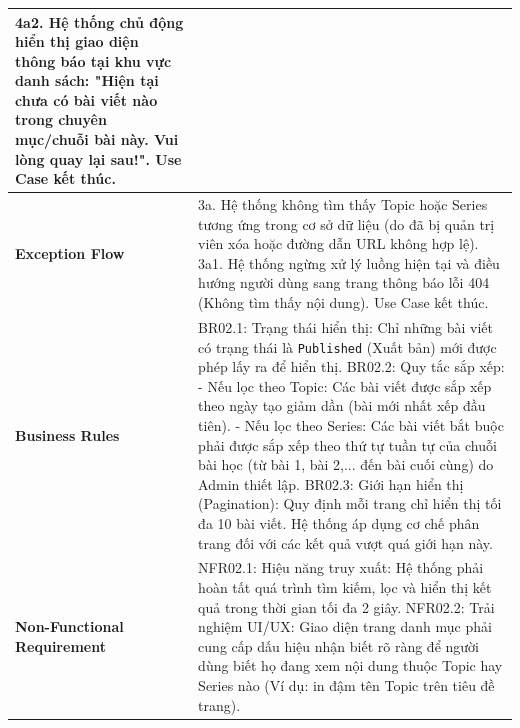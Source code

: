 \documentclass[a4paper,12pt]{article}
\begin{document}
\begin{longtable}{|p{4cm}|p{11.5cm}|}
4a2. Hệ thống chủ động hiển thị giao diện thông báo tại khu vực danh sách: "Hiện tại chưa có bài viết nào trong chuyên mục/chuỗi bài này. Vui lòng quay lại sau!". \newline
Use Case kết thúc. \\ \hline
\textbf{Exception Flow} & 
3a. Hệ thống không tìm thấy Topic hoặc Series tương ứng trong cơ sở dữ liệu (do đã bị quản trị viên xóa hoặc đường dẫn URL không hợp lệ). \newline
3a1. Hệ thống ngừng xử lý luồng hiện tại và điều hướng người dùng sang trang thông báo lỗi 404 (Không tìm thấy nội dung). \newline
Use Case kết thúc. \\ \hline
\textbf{Business Rules} & 
BR02.1: Trạng thái hiển thị: Chỉ những bài viết có trạng thái là \texttt{Published} (Xuất bản) mới được phép lấy ra để hiển thị. \newline
BR02.2: Quy tắc sắp xếp: \newline
- Nếu lọc theo Topic: Các bài viết được sắp xếp theo ngày tạo giảm dần (bài mới nhất xếp đầu tiên). \newline
- Nếu lọc theo Series: Các bài viết bắt buộc phải được sắp xếp theo thứ tự tuần tự của chuỗi bài học (từ bài 1, bài 2,... đến bài cuối cùng) do Admin thiết lập. \newline
BR02.3: Giới hạn hiển thị (Pagination): Quy định mỗi trang chỉ hiển thị tối đa 10 bài viết. Hệ thống áp dụng cơ chế phân trang đối với các kết quả vượt quá giới hạn này. \\ \hline
\textbf{Non-Functional Requirement} & 
NFR02.1: Hiệu năng truy xuất: Hệ thống phải hoàn tất quá trình tìm kiếm, lọc và hiển thị kết quả trong thời gian tối đa 2 giây. \newline
NFR02.2: Trải nghiệm UI/UX: Giao diện trang danh mục phải cung cấp dấu hiệu nhận biết rõ ràng để người dùng biết họ đang xem nội dung thuộc Topic hay Series nào (Ví dụ: in đậm tên Topic trên tiêu đề trang). \\ \hline
\end{longtable}
\end{document}

